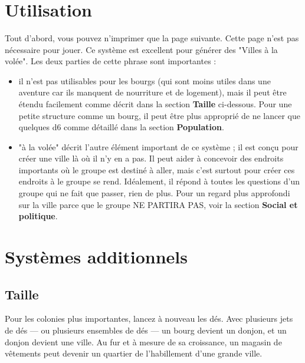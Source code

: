 \documentclass{article}
\begin{document}
\title{\vspace{-0.5cm}{\Huge One-Roll Villes} \vspace{-1cm}}

\date{}

\maketitle

\section*{Utilisation}
Tout d'abord, vous pouvez n’imprimer que la page suivante. Cette page n'est pas nécessaire pour jouer.
Ce système est excellent pour générer des "Villes à la volée". Les deux parties de cette phrase sont importantes :

\begin{itemize}
	\item il n’est pas utilisables pour les bourgs (qui sont moins utiles dans une aventure car ils manquent de nourriture et de logement), mais il peut être étendu facilement comme décrit dans la section \textbf{Taille} ci-dessous. Pour une petite structure comme un bourg, il peut être plus approprié de ne lancer que quelques d6 comme détaillé dans la section \textbf{Population}.
	\item "à la volée" décrit l'autre élément important de ce système ; il est conçu pour créer une ville là où il n'y en a pas. Il peut aider à concevoir des endroits importants où le groupe est destiné à aller, mais c'est surtout pour créer ces endroits à le groupe se rend. Idéalement, il répond à toutes les questions d'un groupe qui ne fait que passer, rien de plus. Pour un regard plus approfondi sur la ville parce que le groupe NE PARTIRA PAS, voir la section \textbf{Social et politique}.
\end{itemize}

\section*{Systèmes additionnels}

\subsection*{Taille}
Pour les colonies plus importantes, lancez à nouveau les dés. Avec plusieurs jets de dés --- ou plusieurs ensembles de dés --- un bourg devient un donjon, et un donjon devient une ville. Au fur et à mesure de sa croissance, un magasin de vêtements peut devenir un quartier de l'habillement d'une grande ville.
\end{document}
